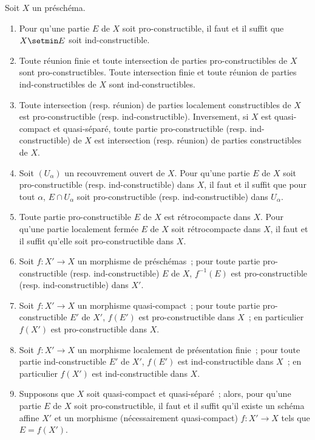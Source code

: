 \begin{proposition}[1.9.5]
\label{IV.1.9.5-fr}
Soit $X$ un préschéma.
\begin{enumerate}
  \item[\textup{(i)}] Pour qu'une partie $E$ de $X$ soit pro-constructible, il faut et
  il suffit que $X\setmin E$ soit ind-constructible.
  \item[\textup{(ii)}] Toute réunion finie et toute intersection de parties
  pro-constructibles de $X$ sont pro-constructibles. Toute intersection
  finie et toute réunion de parties ind-constructibles de $X$ sont
  ind-constructibles.
  \item[\textup{(iii)}] Toute intersection \textup{(resp.} réunion\textup{)} de parties localement
  constructibles de $X$ est pro-constructible \textup{(resp.} ind-constructible\textup{)}.
  Inversement, si $X$ est quasi-compact et quasi-séparé, toute partie
  pro-constructible \textup{(resp.} ind-constructible\textup{)} de $X$ est intersection \textup{(resp.}
  réunion\textup{)} de parties constructibles de $X$.
  \item[\textup{(iv)}] Soit $(U_\alpha)$ un recouvrement ouvert de $X$. Pour qu'une
  partie $E$ de $X$ soit pro-constructible \textup{(resp.} ind-constructible\textup{)} dans
  $X$, il faut et il suffit que pour tout $\alpha$, $E\cap U_\alpha$ soit
  pro-constructible \textup{(resp.} ind-constructible\textup{)} dans $U_\alpha$.
  \item[\textup{(v)}] Toute partie pro-constructible $E$ de $X$ est rétrocompacte
  dans $X$. Pour qu'une partie localement fermée $E$ de $X$ soit
  rétrocompacte dans $X$, il faut et il suffit qu'elle soit
  pro-constructible dans $X$.
  \item[\textup{(vi)}] Soit $f:X'\to X$ un morphisme de préschémas~; pour toute partie
  pro-constructible \textup{(resp.} ind-constructible\textup{)} $E$ de $X$, $f^{-1}(E)$ est
  pro-constructible \textup{(resp.} ind-constructible\textup{)} dans $X'$.
  \item[\textup{(vii)}] Soit $f:X'\to X$ un morphisme quasi-compact~; pour toute
  partie pro-constructible $E'$ de $X'$, $f(E')$ est pro-constructible dans
  $X$~; en particulier $f(X')$ est pro-constructible dans $X$.
  \item[\textup{(viii)}] Soit $f:X'\to X$ un morphisme localement de présentation
  finie~; pour toute partie ind-constructible $E'$ de $X'$, $f(E')$ est
  ind-constructible dans $X$~; en particulier $f(X')$ est ind-constructible
  dans $X$.
  \item[\textup{(ix)}] Supposons que $X$ soit quasi-compact et quasi-séparé~; alors,
  pour qu'une partie $E$ de $X$ soit pro-constructible, il faut et il suffit
  qu'il existe un schéma affine $X'$ et un morphisme (nécessairement
  quasi-compact) $f:X'\to X$ tels que $E=f(X')$.
\end{enumerate}
\end{proposition}

